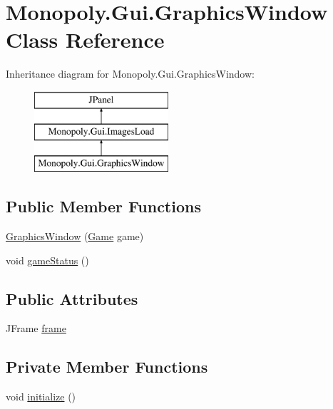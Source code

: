 \hypertarget{class_monopoly_1_1_gui_1_1_graphics_window}{}\section{Monopoly.\+Gui.\+Graphics\+Window Class Reference}
\label{class_monopoly_1_1_gui_1_1_graphics_window}
Inheritance diagram for Monopoly.\+Gui.\+Graphics\+Window\+:\begin{figure}[H]
\begin{center}
\leavevmode
\includegraphics[height=3.000000cm]{class_monopoly_1_1_gui_1_1_graphics_window}
\end{center}
\end{figure}
\subsection*{Public Member Functions}
\begin{DoxyCompactItemize}
\item 
\hyperlink{class_monopoly_1_1_gui_1_1_graphics_window_a16240618dba3bc96b0dcea077c145a97}{Graphics\+Window} (\hyperlink{class_monopoly_1_1_logic_1_1_game}{Game} game)
\item 
void \hyperlink{class_monopoly_1_1_gui_1_1_graphics_window_a8bafa0e5f4f8e1912bd834d58fc648cb}{game\+Status} ()
\end{DoxyCompactItemize}
\subsection*{Public Attributes}
\begin{DoxyCompactItemize}
\item 
J\+Frame \hyperlink{class_monopoly_1_1_gui_1_1_graphics_window_ab43b42c7612644a1ba7c4386cc744ec6}{frame}
\end{DoxyCompactItemize}
\subsection*{Private Member Functions}
\begin{DoxyCompactItemize}
\item 
void \hyperlink{class_monopoly_1_1_gui_1_1_graphics_window_a700f7b4000e6b02ebe2229bb6ba77514}{initialize} ()
\end{DoxyCompactItemize}
